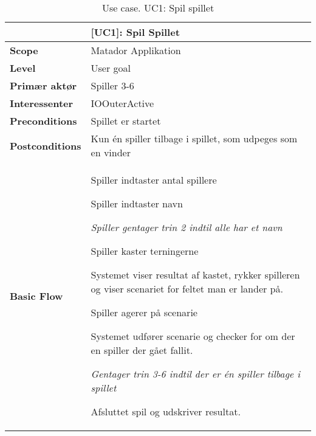 \documentclass[class=article, crop=false]{standalone}
\makeatletter
\let\savespace\@minipagetrue
\makeatother
\begin{document}
    \begin{table}[H]
        \caption{Use case. UC1: Spil spillet}
        \begin{tabularx}{\textwidth}{|l|X|}
            \hline
                                         & \textbf{[UC1]: Spil Spillet}   \\ \hline
            \textbf{Scope}               & Matador Applikation\\ \hline
            \textbf{Level}               & User goal     \\ \hline
            \textbf{Primær aktør}        & Spiller 3-6   \\ \hline
            \textbf{Interessenter}       & IOOuterActive\\ \hline
            \textbf{Preconditions}       & Spillet er startet \\ \hline
            \textbf{Postconditions}      & Kun én spiller tilbage i spillet,
                                           som udpeges som en vinder\\ \hline





            \textbf{Basic Flow} & \begin{tabenum}
                                  \item Spiller indtaster antal spillere
                                  \item Spiller indtaster navn
                                      \savespace
                                        \begin{compactitem}
                                            \item \textit{Spiller gentager trin 2                                                             indtil alle har et navn}
                                  \end{compactitem}
                                      \item Spiller kaster terningerne
                                      \item Systemet viser resultat af kastet, rykker spilleren og viser scenariet for feltet man er lander på.
                                      \item Spiller agerer på scenarie
                                      \item Systemet udfører scenarie og checker for om der en spiller der gået fallit.
                                  \savespace
                                  \begin{compactitem}
                                      \item \textit{Gentager trin 3-6 indtil der er én spiller tilbage i spillet}
                                  \end{compactitem}
                                      \item Afsluttet spil og udskriver resultat.
                                   \end{tabenum}   \\ \hline





\end{tabularx}
\end{table}
\end{document}

